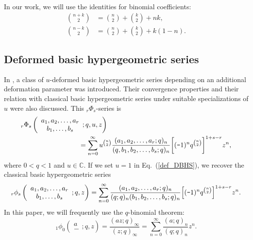 \documentclass[12pt]{article}
\newcommand{\minus}{\textup{\texttt{-}}}
\newcommand{\C}{\mathbb{C}}
\begin{document}
In our work, we will use the identities for binomial coefficients:
\begin{align}
    \binom{n+k}{2}&=\binom{n}{2}+\binom{k}{2}+nk,\label{iden7}\\
    \binom{n-k}{2}&=\binom{n}{2}+\binom{k}{2}+k(1-n).\label{iden8}
\end{align}

\subsection{Deformed basic hypergeometric series}

In \cite{orozco}, a class of \(u\)-deformed basic hypergeometric series depending on an additional deformation parameter was introduced. Their convergence properties and their relation with classical basic hypergeometric series under suitable specializations of \(u\) were also discussed. This ${}_{r}\Phi_{s}$-series is
   \begin{align}
        &{}_{r}\Phi_{s}\left(
    \begin{array}{c}
         a_{1},a_{2},\ldots,a_{r} \\
         b_{1},\ldots,b_{s}
    \end{array}
    ;q,u,z
    \right)\nonumber\\
    &\hspace{3cm}=\sum_{n=0}^{\infty}u^{\binom{n}{2}}\frac{(a_{1},a_{2},\ldots,a_{r};q)_{n}}{(q,b_{1},b_{2},\ldots,b_{s};q)_{n}}\bigg[(\minus1)^nq^{\binom{n}{2}}\bigg]^{1+s-r}z^n,\label{def_DBHS}
    \end{align}
where $0<q<1$ and $u\in\C$. If we set \(u=1\) in Eq.~(\ref{def_DBHS}), we recover the classical basic hypergeometric series
\begin{equation*}
    {}_r\phi_{s}\left(
    \begin{array}{c}
         a_{1},a_{2},\ldots,a_{r} \\
         b_{1},\ldots,b_{s}
    \end{array}
    ;q,z
    \right)=\sum_{n=0}^{\infty}\frac{(a_{1},a_{2},\ldots,a_{r};q)_{n}}{(q;q)_{n}(b_{1},b_{2},\ldots,b_{s};q)_{n}}\Big[(\minus1)^{n}q^{\binom{n}{2}}\Big]^{1+s-r}z^n.
\end{equation*}
In this paper, we will frequently use the $q$-binomial theorem:
\begin{equation}
    {}_1\phi_{0}\left(\begin{array}{c}
         a\\
         - 
    \end{array};q,z\right)=\frac{(az;q)_{\infty}}{(z;q)_{\infty}}=\sum_{n=0}^{\infty}\frac{(a;q)_{n}}{(q;q)_{n}}z^{n}.
\end{equation}
\end{document}
